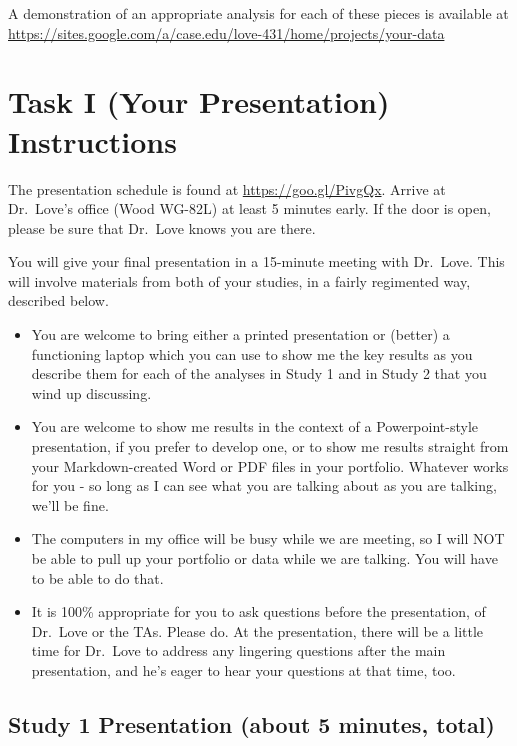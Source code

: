 \documentclass[]{book}
\providecommand{\tightlist}{%
  \setlength{\itemsep}{0pt}\setlength{\parskip}{0pt}}
\theoremstyle{definition}
\theoremstyle{definition}
\theoremstyle{definition}
\theoremstyle{remark}
\begin{document}
A demonstration of an appropriate analysis for each of these pieces is
available at
\url{https://sites.google.com/a/case.edu/love-431/home/projects/your-data}

\hypertarget{task-i-your-presentation-instructions}{%
\chapter{Task I (Your Presentation)
Instructions}\label{task-i-your-presentation-instructions}}

The presentation schedule is found at \url{https://goo.gl/PivgQx}.
Arrive at Dr.~Love's office (Wood WG-82L) at least 5 minutes early. If
the door is open, please be sure that Dr.~Love knows you are there.

You will give your final presentation in a 15-minute meeting with
Dr.~Love. This will involve materials from both of your studies, in a
fairly regimented way, described below.

\begin{itemize}
\tightlist
\item
  You are welcome to bring either a printed presentation or (better) a
  functioning laptop which you can use to show me the key results as you
  describe them for each of the analyses in Study 1 and in Study 2 that
  you wind up discussing.
\item
  You are welcome to show me results in the context of a
  Powerpoint-style presentation, if you prefer to develop one, or to
  show me results straight from your Markdown-created Word or PDF files
  in your portfolio. Whatever works for you - so long as I can see what
  you are talking about as you are talking, we'll be fine.
\item
  The computers in my office will be busy while we are meeting, so I
  will NOT be able to pull up your portfolio or data while we are
  talking. You will have to be able to do that.
\item
  It is 100\% appropriate for you to ask questions before the
  presentation, of Dr.~Love or the TAs. Please do. At the presentation,
  there will be a little time for Dr.~Love to address any lingering
  questions after the main presentation, and he's eager to hear your
  questions at that time, too.
\end{itemize}

\hypertarget{study-1-presentation-about-5-minutes-total}{%
\section{Study 1 Presentation (about 5 minutes,
total)}\label{study-1-presentation-about-5-minutes-total}}
\end{document}
